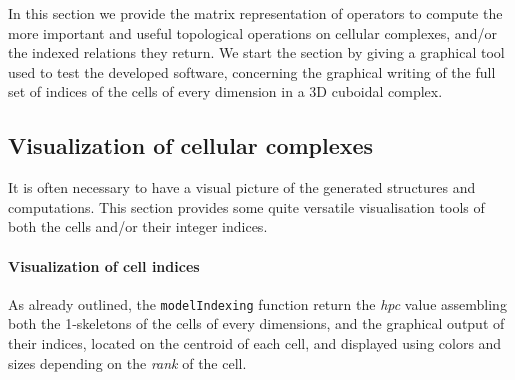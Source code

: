 \documentclass[11pt,oneside]{article}    %
\begin{document}
In this section we provide the matrix representation of operators to compute the more important and useful topological operations on cellular complexes, and/or the indexed relations they return. We start the section by giving a graphical tool used to test the developed software, concerning the graphical writing of the full set of indices of the cells of every dimension in a 3D cuboidal complex.  

\subsection{Visualization of cellular complexes}

It is often necessary to have a visual picture of the generated structures and computations.
This section provides some quite versatile visualisation tools of both the cells and/or their integer indices.

\paragraph{Visualization of cell indices}
As already outlined, the \texttt{modelIndexing} function return the \emph{hpc} value assembling both the 1-skeletons of the cells of every dimensions, and the graphical output of their indices, located on the centroid of each cell, and displayed using colors and sizes depending on the \emph{rank} of the cell.
\end{document}
